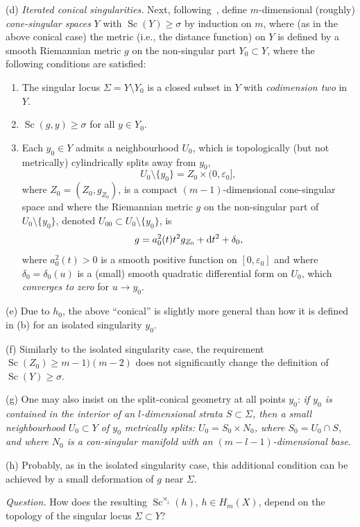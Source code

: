 \documentclass[pdftex]{sigma}
\numberwithin{equation}{section}
\begin{document}
(d) {\it Iterated conical singularities.} Next, following~\cite{Ch1979}, define $m$-dimensional (roughly) {\it cone-singular spaces} $Y$ with $\operatorname{Sc}(Y)\geq \sigma$ by induction on $m$, where (as in the above conical case) the metric (i.e., the distance function) on $Y$ is defined
by a smooth Riemannian metric $g$ on the non-singular part $Y_0\subset Y$, where the following conditions are satisfied:
\begin{enumerate}\itemsep=0pt
\item[(i)] The singular locus $\Sigma=Y\setminus Y_0$ is a closed subset in $Y$ with {\it codimension two} in $Y$.
\item[(ii)] $\operatorname{Sc}(g, y)\geq \sigma$ for all $y\in Y_0$.
\item[(iii)] Each $y_0\in Y$ admits a neighbourhood $U_0$, which is topologically (but not metrically) cylindrically splits away from $y_0$,
\[
U_0\setminus\{y_0\}=Z_0\times (0,\varepsilon_0],
\]
 where $Z_0=(Z_0, g_{Z_0})$, is a compact $(m-1)$-dimensional cone-singular space and where the Riemannian metric $g$ on the non-singular part
 of $U_0\setminus \{y_0\}$, denoted $U_{00} \subset U_0\setminus \{y_0\}$, is
\[
g= a_0^2(t)t^2g_{Z_0} +{\rm d}t^2+\delta_0,
\]
where $a_0^2(t)>0$ is a smooth positive function on $[0, \varepsilon_0]$ and where $\delta_0=\delta_0(u)$
 is a (small) smooth quadratic differential form on $U_0$, which {\it converges to zero} for $u\to y_0$.
\end{enumerate}

(e) Due to $h_0$, the above ``conical'' is slightly more general than how it is defined in (b) for an isolated singularity $y_0$.

(f) Similarly to the isolated singularity case, the requirement $\operatorname{Sc}(Z_0)\geq m-1)(m-2)$ does not significantly change the definition of $\operatorname{Sc}(Y)\geq \sigma$.

(g) One may also insist on the split-conical geometry at all points $y_0$:
{\it if $y_0$ is contained in the interior of an $l$-dimensional strata $S\subset \Sigma$, then
 a small neighbourhood $U_0\subset Y $ of $y_0$ metrically splits:
$U_0=S_0\times N_0$, where $S_0=U_0\cap S$, and where $N_0$ is a con-singular manifold with an $(m-l-1)$-dimensional base.}

(h) Probably, as in the isolated singularity case, this additional condition can be achieved by a small deformation of $g$ near $\Sigma$.

{\it Question.} How does the resulting
$\operatorname{Sc}^{\rtimes_\downarrow}(h)$, $h\in H_m(X)$, depend on the topology of the singular locus $\Sigma \subset Y$?
\end{document}
